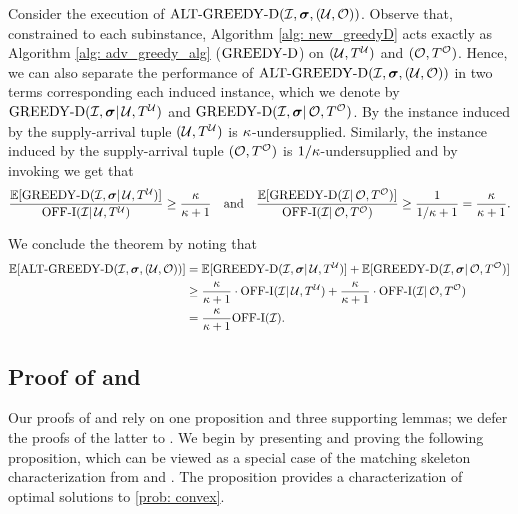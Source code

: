 {    Consider the execution of $\mathrm{ALT\textrm{-}GREEDY\textrm{-}D}(\mathcal I,\bm{\sigma}, (\mathcal U,\mathcal O))$. Observe that, constrained to each subinstance, Algorithm \ref{alg: new_greedyD} acts exactly as Algorithm \ref{alg: adv_greedy_alg} ($\mathrm{GREEDY\textrm{-}D}$) on $(\mathcal U, T^\mathcal U)$ and $(\mathcal O, T^{\mathcal O})$. Hence, we can also separate the performance of $\mathrm{ALT\textrm{-}GREEDY\textrm{-}D}(\mathcal I,\bm{\sigma}, (\mathcal U,\mathcal O))$ in two terms corresponding each induced instance, which we denote by $\mathrm{GREEDY\textrm{-}D}(\mathcal I, \bm{\sigma} |\, \mathcal U, T^{\mathcal U})$ and $\mathrm{GREEDY\textrm{-}D}(\mathcal I, \bm{\sigma} |\, \mathcal O, T^\mathcal O)$. By  the instance induced by the supply-arrival tuple $(\mathcal U, T^\mathcal U)$ is $\kappa$-undersupplied. Similarly, the instance induced by the supply-arrival tuple $(\mathcal O, T^{\mathcal O})$ is $1/\kappa$-undersupplied and by invoking  we get that
        \begin{equation*}
    \frac{\mathbb E[ \mathrm{GREEDY\textrm{-}D}(\mathcal I, \bm{\sigma} |\, \mathcal U, T^{\mathcal U})]}{\mathrm{\mathrm{OFF}}\textrm{-}\mathrm{I}(\mathcal I |\, \mathcal U, T^{\mathcal U})} \geq \frac{\kappa}{\kappa + 1} \quad \text{and} \quad 
    \frac{\mathbb E[ \mathrm{GREEDY\textrm{-}D}(\mathcal I | \, \mathcal O, T^\mathcal O)]}{\mathrm{\mathrm{OFF}}\textrm{-}\mathrm{I}(\mathcal I |\, \mathcal O, T^\mathcal O)} \geq \frac{1}{1/\kappa + 1} = \frac{\kappa}{\kappa + 1}.
\end{equation*}

We conclude the theorem by noting that
\begin{align*}
    \mathbb E[ \mathrm{ALT\textrm{-}GREEDY\textrm{-}D}(\mathcal I, \bm{\sigma}, (\mathcal U, \mathcal O))] &= \mathbb E[ \mathrm{GREEDY\textrm{-}D}(\mathcal I, \bm{\sigma} |\, \mathcal U, T^{\mathcal U})] + \mathbb E[ \mathrm{GREEDY\textrm{-}D}(\mathcal I, \bm{\sigma} |\, \mathcal O, T^\mathcal O)]\\
    &\geq \frac{\kappa}{\kappa+ 1} \cdot \mathrm{\mathrm{OFF}}\textrm{-}\mathrm{I}(\mathcal I |\, \mathcal U, T^{\mathcal U}) + \frac{\kappa}{\kappa+ 1} \cdot \mathrm{\mathrm{OFF}}\textrm{-}\mathrm{I}(\mathcal I |\, \mathcal O, T^\mathcal O)\\
    &= \frac{\kappa}{\kappa+ 1}\mathrm{\mathrm{OFF}}\textrm{-}\mathrm{I}(\mathcal I).
\end{align*}
\hfill
\Halmos


\subsection{Proof of  and }
\label{proof: k-imbalanced and sol_does_not_use_edges}

{Our proofs of   and  rely on one proposition and three supporting lemmas; we defer the proofs of the latter to .  We begin by presenting and proving the following proposition, which can be viewed as a special case of the matching skeleton characterization from \citet{goel2012communication} and \citet{feng2024two}. %
The proposition provides a characterization of optimal solutions to \ref{prob: convex}.
} 

}

